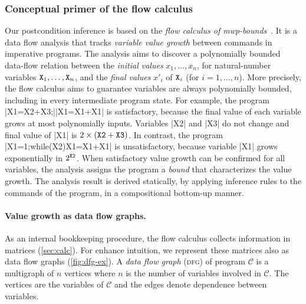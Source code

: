 \subsubsection{Conceptual primer of the flow calculus}
\label{subsec:flow-calc-intro}

Our postcondition inference is based on the \emph{flow calculus of mwp-bounds}~\cite{jones2009,aubert20222}.
It is a data flow analysis that tracks \emph{variable value growth} between commands in imperative programs.
The analysis aims to discover a polynomially bounded data-flow relation between the
\emph{initial values} \(x_1,\ldots,x_n\), for natural-number variables \(\prm{X}_1,\ldots,\prm{X}_n\), and the
\emph{final values} \(x'_i\) of \(\prm{X}_i\) (for \(i=1,\ldots,n\)).
More precisely, the flow calculus aims to guarantee variables are always polynomially bounded, including in every intermediate program state.
For example, the program \pr|X1=X2+X3;|\pr|X1=X1+X1| is satisfactory, because the final value of each variable grows at most polynomially \wrt inputs.
Variables \pr|X2| and \pr|X3| do not change and final value of \pr|X1| is \(2 \times (\prm{X2} + \prm{X3})\).
In contrast, the program \pr|X1=1;while(X2){X1=X1+X1}| is unsatisfactory, because variable \pr|X1| grows exponentially in \(2^{\prm{X2}}\).
When satisfactory value growth can be confirmed for all variables, the analysis assigns the program a \emph{bound} that characterizes the value growth.
The analysis result is derived statically, by applying inference rules to the commands of the program, in a compositional bottom-up manner.

\paragraph*{Value growth as data flow graphs.}
As an internal bookkeeping procedure, the flow calculus collects information in matrices (\autoref{sec:calc}).
For enhance intuition, we represent these matrices also as data flow graphs (\autoref{fig:dfg-ex}).
A \emph{data flow graph} (\textsc{dfg}) of program \(\mathcal{C}\) is a multigraph of \(n\) vertices where \(n\) is the number of variables
involved in \(\mathcal{C}\).
The vertices are the variables of \(\mathcal{C}\) and the edges denote {dependence} between variables.

